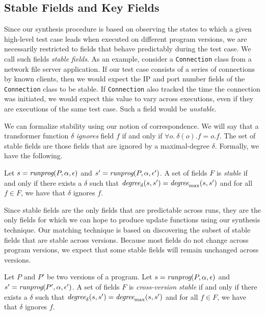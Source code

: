 \subsection{Stable Fields and Key Fields}

Since our synthesis procedure is based on observing the states to
which a given high-level test case leads when executed on different
program versions, we are necessarily restricted to fields that behave
predictably during the test case.  We call such fields \emph{stable
  fields}.  As an example, consider a \texttt{Connection} class from a
network file server application.  If our test case consists of a
series of connections by known clients, then we would expect the IP
and port number fields of the \texttt{Connection} class to be stable.
If \texttt{Connection} also tracked the time the connection was
initiated, we would expect this value to vary across executions, even
if they are executions of the same test case.  Such a field would be
\emph{unstable}.

We can formalize stability using our notion of correspondence.  We
will say that a transformer function $\delta$ \emph{ignores} field $f$
if and only if $\forall o.\ \delta(o).f = o.f$.  The set of stable
fields are those fields that are ignored by a maximal-degree $\delta$.
Formally, we have the following.

\begin{defn}
Let $s = \textit{runprog}(P,\alpha,\epsilon)$ and $s' =
\textit{runprog}(P,\alpha,\epsilon')$.  A set of fields $F$ is \emph{stable} if
and only if there exists a $\delta$ such that $\textit{degree}_{\delta}(s,s') =
\textit{degree}_\textrm{max}(s,s')$ and for all $f \in F$, we have that $\delta$ ignores
$f$.
\end{defn}

Since stable fields are the only fields that are predictable across
runs, they are the only fields for which we can hope to produce update
functions using our synthesis technique.  Our matching technique is
based on discovering the subset of stable fields that are stable
across versions.  Because most fields do not change across program
versions, we expect that some stable fields will remain unchanged
across versions.

\begin{defn}
Let $P$ and $P'$ be two versions of a program.  Let $s =
\textit{runprog}(P,\alpha,\epsilon)$ and $s' = \textit{runprog}(P',\alpha,\epsilon')$.
A set of fields $F$ is \emph{cross-version stable} if and only if
there exists a $\delta$ such that $\textit{degree}_{\delta}(s,s') =
\textit{degree}_\textrm{max}(s,s')$ and for all $f \in F$, we have that $\delta$ ignores
$f$.
\end{defn}

